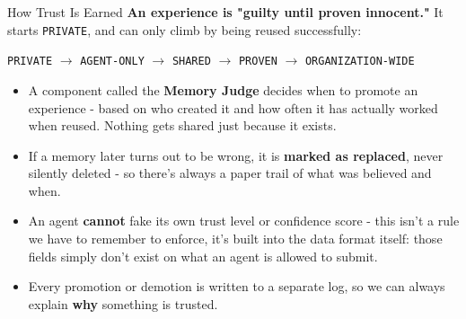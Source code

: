\documentclass{beamer}
\begin{document}
\begin{frame}{How Trust Is Earned}
\textbf{An experience is "guilty until proven innocent."} It starts \texttt{PRIVATE}, and can only climb by being reused successfully:
\begin{center}
\scriptsize
\texttt{PRIVATE} $\rightarrow$ \texttt{AGENT-ONLY} $\rightarrow$ \texttt{SHARED} $\rightarrow$ \texttt{PROVEN} $\rightarrow$ \texttt{ORGANIZATION-WIDE}
\end{center}

\begin{itemize}
    \item A component called the \textbf{Memory Judge} decides when to promote an experience - based on who created it and how often it has actually worked when reused. Nothing gets shared just because it exists.
    \item If a memory later turns out to be wrong, it is \textbf{marked as replaced}, never silently deleted - so there's always a paper trail of what was believed and when.
    \item An agent \textbf{cannot} fake its own trust level or confidence score - this isn't a rule we have to remember to enforce, it's built into the data format itself: those fields simply don't exist on what an agent is allowed to submit.
    \item Every promotion or demotion is written to a separate log, so we can always explain \textbf{why} something is trusted.
\end{itemize}
\end{frame}

\end{document}
